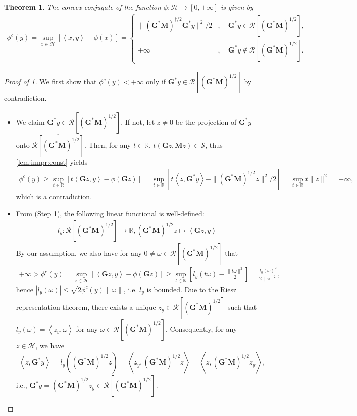 \documentclass[noinfoline]{imsart}\setcounter{tocdepth}{2}
\renewcommand{\b}[1]{\mathbb{#1}} %
\newcommand{\m}[1]{\mathbf{#1}} %
\renewcommand{\c}[1]{\mathcal{#1}} %
\newcommand{\innpr}[2]{{\left\langle {#1},{#2}\right\rangle}} %
\theoremstyle{plain}
\newtheorem{theorem}{Theorem}[section]
\begin{document}
\begin{theorem}\label{thm:legen:transf}
The convex conjugate of the function $\phi: \c{H} \to [0, +\infty]$ is given by
\begin{align*}
    \phi^{c}(y) = \sup_{x \in \c{H}} [\innpr{x}{y} - \phi(x)] = 
    \begin{cases}
        \|(\m{G}^{*} \m{M})^{\dagger/2} \m{G}^{*} y \|^{2}/2 &, \quad \m{G}^{*} y \in \c{R}[(\m{G}^{*} \m{M})^{1/2}], \\
        +\infty &, \quad \m{G}^{*} y \notin \c{R}[(\m{G}^{*} \m{M})^{1/2}]. 
    \end{cases}
\end{align*}
\end{theorem}
\begin{proof}[Proof of \cref{thm:legen:transf}]
We first show that $\phi^{c}(y) < +\infty$ only if $\m{G}^{*} y \in \c{R}[(\m{G}^{*} \m{M})^{1/2}]$ by contradiction. 
\begin{itemize}
\item [(Step 1)] We claim $\m{G}^{*} y \in \overline{\c{R}[(\m{G}^{*} \m{M})^{1/2}]}$. If not, let $z \ne 0$ be the projection of $\m{G}^{*} y$ onto $\overline{\c{R}[(\m{G}^{*} \m{M})^{1/2}]}$. Then, for any $t \in \b{R}$, $t(\m{G}z, \m{M}z) \in \c{S}$, thus \cref{lem:innpr:const} yields
\begin{align*}
    \phi^{c}(y) \ge \sup_{t \in \b{R}} [t \innpr{\m{G} z}{y} - \phi(\m{G} z)] = \sup_{t \in \b{R}} [t \innpr{z}{\m{G}^{*} y} - \|(\m{G}^{*} \m{M})^{1/2}z\|^{2}/2] = \sup_{t \in \b{R}} t \|z\|^{2} = +\infty,
\end{align*}
which is a contradiction.

\item [(Step 2)] From (Step 1), the following linear functional is well-defined:
\begin{align*}
    l_{y} : \c{R}[(\m{G}^{*} \m{M})^{1/2}] \to \b{R}, (\m{G}^{*} \m{M})^{1/2} z \mapsto \innpr{\m{G} z}{y}
\end{align*}
By our assumption, we also have for any $0 \ne \omega \in \c{R}[(\m{G}^{*} \m{M})^{1/2}]$ that
\begin{align*}
    + \infty > \phi^{c}(y) = \sup_{z \in \c{H}} [\innpr{\m{G} z}{y} - \phi(\m{G} z)] \ge \sup_{t \in \b{R}} \left[l_{y}(t \omega) - \frac{\|t \omega\|^{2}}{2} \right] = \frac{l_{y}(\omega)^{2}}{2 \|\omega\|^{2}},
\end{align*}
hence $|l_{y}(\omega)| \le \sqrt{2 \phi^{c}(y)} \|\omega\|$, i.e. $l_{y}$ is bounded. Due to the Riesz representation theorem, there exists a unique $z_{y} \in \overline{\c{R}[(\m{G}^{*} \m{M})^{1/2}]}$ such that $l_{y}(\omega) = \innpr{z_{y}}{\omega}$ for any $\omega \in \c{R}[(\m{G}^{*} \m{M})^{1/2}]$. Consequently, for any $z \in \c{H}$, we have
\begin{align*}
    \innpr{z}{\m{G}^{*} y} = l_{y}((\m{G}^{*} \m{M})^{1/2}z) = \innpr{z_{y}}{(\m{G}^{*} \m{M})^{1/2}z} = \innpr{z}{(\m{G}^{*} \m{M})^{1/2} z_{y}},
\end{align*}
i.e., $\m{G}^{*} y = (\m{G}^{*} \m{M})^{1/2} z_{y} \in \c{R}[(\m{G}^{*} \m{M})^{1/2}]$.
\end{itemize}


\end{proof}
\end{document}
